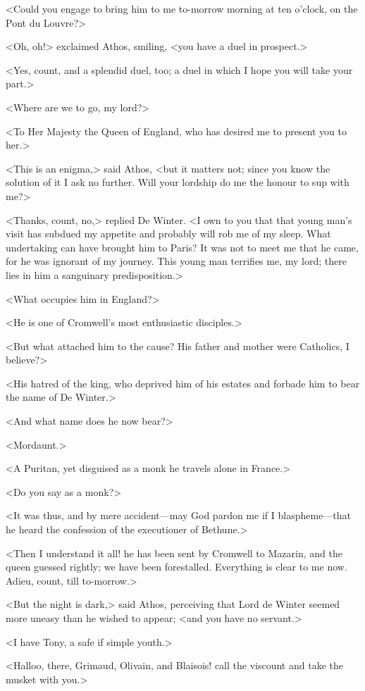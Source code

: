 <Could you engage to bring him to me to-morrow morning at ten o'clock, on the Pont du Louvre?>

<Oh, oh!> exclaimed Athos, smiling, <you have a duel in prospect.>

<Yes, count, and a splendid duel, too; a duel in which I hope you will take your part.>

<Where are we to go, my lord?>

<To Her Majesty the Queen of England, who has desired me to present you to her.>

<This is an enigma,> said Athos, <but it matters not; since you know the solution of it I ask no further. Will your lordship do me the honour to sup with me?>

<Thanks, count, no,> replied De Winter. <I own to you that that young man's visit has subdued my appetite and probably will rob me of my sleep. What undertaking can have brought him to Paris? It was not to meet me that he came, for he was ignorant of my journey. This young man terrifies me, my lord; there lies in him a sanguinary predisposition.>

<What occupies him in England?>

<He is one of Cromwell's most enthusiastic disciples.>

<But what attached him to the cause? His father and mother were Catholics, I believe?>

<His hatred of the king, who deprived him of his estates and forbade him to bear the name of De Winter.>

<And what name does he now bear?>

<Mordaunt.>

<A Puritan, yet disguised as a monk he travels alone in France.>

<Do you say as a monk?>

<It was thus, and by mere accident—may God pardon me if I blaspheme—that he heard the confession of the executioner of Bethune.>

<Then I understand it all! he has been sent by Cromwell to Mazarin, and the queen guessed rightly; we have been forestalled. Everything is clear to me now. Adieu, count, till to-morrow.>

<But the night is dark,> said Athos, perceiving that Lord de Winter seemed more uneasy than he wished to appear; <and you have no servant.>

<I have Tony, a safe if simple youth.>

<Halloo, there, Grimaud, Olivain, and Blaisois! call the viscount and take the musket with you.>


